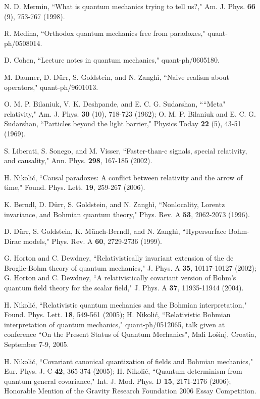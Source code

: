 \documentclass[12pt]{article}
\begin{document}
\begin{thebibliography}{99}
N. D. Mermin,
``What is quantum mechanics trying to tell us?,"
Am. J. Phys. {\bf 66} (9), 753-767 (1998).

R. Medina,
``Orthodox quantum mechanics free from paradoxes,"
quant-ph/0508014.

D. Cohen,
``Lecture notes in quantum mechanics,"
quant-ph/0605180.

M. Daumer, D. D\"urr, S. Goldstein, and N. Zangh\`i, 
``Naive realism about operators,"
quant-ph/9601013.

O. M. P. Bilaniuk, V. K. Deshpande, and E. C. G. Sudarshan,
````Meta" relativity,"
Am. J. Phys. {\bf 30} (10), 718-723 (1962);
%
O. M. P. Bilaniuk and E. C. G. Sudarshan,
``Particles beyond the light barrier,"
Physics Today {\bf 22} (5), 43-51 (1969).

S. Liberati, S. Sonego, and M. Visser,
``Faster-than-c signals, special relativity, and causality,"
Ann. Phys. {\bf 298}, 167-185 (2002).

H. Nikoli\'c,
``Causal paradoxes: A conflict between relativity and the arrow of time,"
Found. Phys. Lett. {\bf 19}, 259-267 (2006).

K. Berndl, D. D\"urr, S. Goldstein, and N. Zangh\`i,
``Nonlocality, Lorentz invariance, and Bohmian quantum theory,"
Phys. Rev. A {\bf 53}, 2062-2073 (1996).

D. D\"urr, S. Goldstein, K. M\"unch-Berndl, and N. Zangh\`i,
``Hypersurface Bohm-Dirac models,"
Phys. Rev. A {\bf 60}, 2729-2736 (1999).

G. Horton and C. Dewdney, 
``Relativistically invariant extension of the de Broglie-Bohm theory of
quantum mechanics,"
J. Phys. A {\bf 35}, 10117-10127 (2002);
G. Horton and C. Dewdney,
``A relativistically covariant version of Bohm's quantum field theory for
the scalar field,"
J. Phys. A {\bf 37}, 11935-11944 (2004).

H. Nikoli\'c, 
``Relativistic quantum mechanics and the Bohmian interpretation,"
Found. Phys. Lett. {\bf 18}, 549-561 (2005);
H. Nikoli\'c, 
``Relativistic Bohmian interpretation of quantum mechanics," 
quant-ph/0512065,
talk given at conference ``On the Present Status of Quantum Mechanics", Mali
Lo\v{s}inj, Croatia, September 7-9, 2005.

H. Nikoli\'c,
``Covariant canonical quantization of fields and Bohmian mechanics,"
Eur. Phys. J. C {\bf 42}, 365-374 (2005);
H. Nikoli\'c,
``Quantum determinism from quantum general covariance,"
Int. J. Mod. Phys. D {\bf 15}, 2171-2176 (2006);
Honorable Mention of the Gravity Research Foundation 2006 Essay Competition.


\end{thebibliography}
\end{document}
